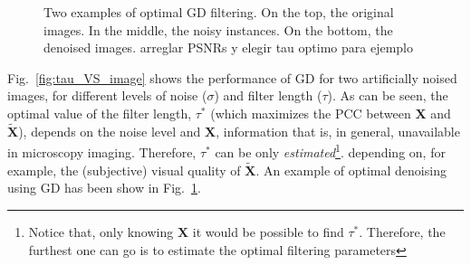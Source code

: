 \documentclass{article}
\begin{document}
\begin{figure}
{\begin{tabular}{cc}
    \end{tabular}
  }
  \caption{Two examples of optimal GD filtering. On the top, the
    original images. In the middle, the noisy instances. On the
    bottom, the denoised images. {\color{red} arreglar PSNRs y elegir
      tau optimo para ejemplo}\label{fig:GD_tau_optimal}}
\end{figure}

Fig.~\ref{fig:tau_VS_image} shows the performance of GD for two
artificially noised images, for different levels of noise ($\sigma$)
and filter length ($\tau$). As can be seen, the optimal value of the
filter length, $\tau^*$ (which maximizes the PCC between $\mathbf{X}$
and $\tilde{\mathbf{X}}$), depends on the noise level and
$\mathbf{X}$, information that is, in general, unavailable in
microscopy imaging. Therefore, $\tau^*$ can be only
\emph{estimated}\footnote{Notice that, only knowing $\mathbf{X}$ it
  would be possible to find $\tau^*$. Therefore, the furthest one can
  go is to estimate the optimal filtering parameters}. depending on,
for example, the (subjective) visual quality of
$\tilde{\mathbf{X}}$. An example of optimal denoising using GD has
been show in Fig.~\ref{fig:GD_tau_optimal}.

\end{document}
